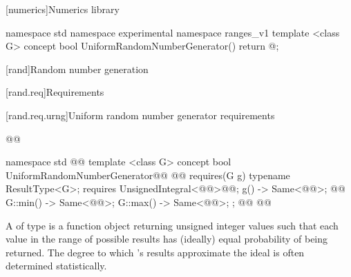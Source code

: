 [numerics]{Numerics library}

{\color{newclr}

\begin{codeblock}
namespace std { namespace experimental { namespace ranges_v1 {
  template <class G>
  concept bool UniformRandomNumberGenerator() { return @\seebelow@; }
}}}
\end{codeblock}
}

\setcounter{section}{4}
[rand]{Random number generation}

[rand.req]{Requirements}


\setcounter{subsubsection}{2}
[rand.req.urng]{Uniform random number generator requirements}%
%

\begin{addedblock}
\begin{codeblock}
@@

namespace std { @@
  template <class G>
  concept bool UniformRandomNumberGenerator@\newtxt{() \{}\oldtxt{ =}@
    @@ requires(G g) {
      typename ResultType<G>;
      requires UnsignedIntegral<@@>@\newtxt{()}@;
      { g() } -> Same<@@>; @@
      { G::min() } -> Same<@@>;
      { G::max() } -> Same<@@>;
    };
  @\newtxt{\}}@
}@\newtxt{\}\}}@
\end{codeblock}
\end{addedblock}

\pnum
A 
 of type 
is a function object
returning unsigned integer values
such that each value
in the range of possible results
has (ideally) equal probability
of being returned.
\enternote
 The degree to which 's results
 approximate the ideal
 is often determined statistically.
\exitnote


